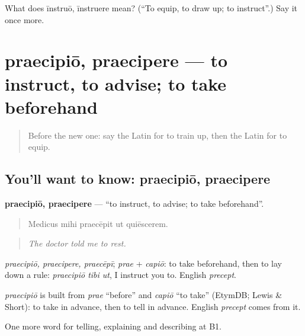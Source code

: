 \begin{tcolorbox}[breakable,colback=teal!4,colframe=teal!35!black,title={Before you move on}]
What does īnstruō, īnstruere mean? (\textquotedblleft{}To equip, to draw up; to instruct\textquotedblright{}.) Say it once more.
\end{tcolorbox}
\section[praecipiō, praecipere]{praecipiō, praecipere — to instruct, to advise; to take beforehand}

\label{lesson:LA-C400-praecipio}



\begin{quote}
Before the new one: say the Latin for to train up, then the Latin for to equip.
\end{quote}

\subsection*{You'll want to know: praecipiō, praecipere}
\textbf{praecipiō, praecipere} — \textquotedblleft{}to instruct, to advise; to take beforehand\textquotedblright{}.

\begin{quote}
Medicus mihi praecēpit ut quiēscerem.
\end{quote}

\begin{quote}
\emph{The doctor told me to rest.}
\end{quote}

\emph{praecipiō, praecipere, praecēpī}; \emph{prae} + \emph{capiō}: to take beforehand, then to lay down a rule: \emph{praecipiō tibi ut}, I instruct you to. English \emph{precept}.

\begin{cousinweb}
\emph{praecipiō} is built from \emph{prae} \textquotedblleft{}before\textquotedblright{} and \emph{capiō} \textquotedblleft{}to take\textquotedblright{} (EtymDB; Lewis \& Short): to take in advance, then to tell in advance. English \emph{precept} comes from it.
\end{cousinweb}

\begin{grammarlens}[title={What you've built}]
One more word for telling, explaining and describing at B1.
\end{grammarlens}

